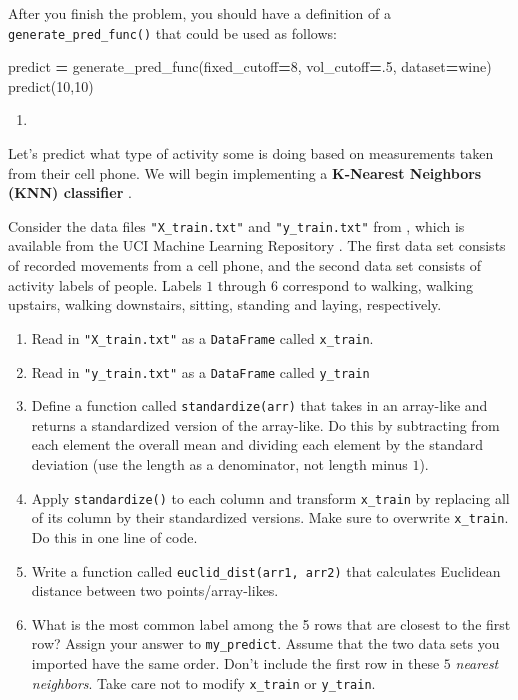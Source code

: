 \documentclass[
  12pt,
  krantz2]{krantz}
\makeatletter
\newenvironment{Shaded}{\begin{snugshade}}{\end{snugshade}}
\newcommand{\DecValTok}[1]{\textcolor[rgb]{0.06,0.06,0.06}{#1}}
\newcommand{\FloatTok}[1]{\textcolor[rgb]{0.06,0.06,0.06}{#1}}
\newcommand{\NormalTok}[1]{#1}
\newcommand{\OperatorTok}[1]{\textcolor[rgb]{0.43,0.43,0.43}{\textbf{#1}}}
\providecommand{\tightlist}{%
  \setlength{\itemsep}{0pt}\setlength{\parskip}{0pt}}
\newenvironment{kframe}{%
\medskip{}
\setlength{\fboxsep}{.8em}
 \def\at@end@of@kframe{}%
 \ifinner\ifhmode%
  \def\at@end@of@kframe{\end{minipage}}%
  \begin{minipage}{\columnwidth}%
 \fi\fi%
 \def\FrameCommand##1{\hskip\@totalleftmargin \hskip-\fboxsep
 \colorbox{shadecolor}{##1}\hskip-\fboxsep
     \hskip-\linewidth \hskip-\@totalleftmargin \hskip\columnwidth}%
 \MakeFramed {\advance\hsize-\width
   \@totalleftmargin\z@ \linewidth\hsize
   \@setminipage}}%
 {\par\unskip\endMakeFramed%
 \at@end@of@kframe}
\renewenvironment{Shaded}{\begin{kframe}}{\end{kframe}}
\makeatother
\begin{document}
After you finish the problem, you should have a definition of a \texttt{generate\_pred\_func()} that could be used as follows:

\begin{Shaded}
\begin{Highlighting}[]
\NormalTok{predict }\OperatorTok{=}\NormalTok{ generate\_pred\_func(fixed\_cutoff}\OperatorTok{=}\DecValTok{8}\NormalTok{, vol\_cutoff}\OperatorTok{=}\FloatTok{.5}\NormalTok{, dataset}\OperatorTok{=}\NormalTok{wine)}
\NormalTok{predict(}\DecValTok{10}\NormalTok{,}\DecValTok{10}\NormalTok{)}
\end{Highlighting}
\end{Shaded}

\begin{enumerate}
\def\labelenumi{\arabic{enumi}.}
\setcounter{enumi}{2}
\tightlist
\item
\end{enumerate}

Let's predict what type of activity some is doing based on measurements taken from their cell phone. We will begin implementing a \textbf{K-Nearest Neighbors (KNN) classifier} \citep{knn1} \citep{knn2}.

Consider the data files \texttt{"X\_train.txt"} and \texttt{"y\_train.txt"} from \citep{Anguita2013APD}, which is available from the UCI Machine Learning Repository \citep{uci_data}. The first data set consists of recorded movements from a cell phone, and the second data set consists of activity labels of people. Labels \(1\) through \(6\) correspond to walking, walking upstairs, walking downstairs, sitting, standing and laying, respectively.

\begin{enumerate}
\def\labelenumi{\alph{enumi})}
\tightlist
\item
  Read in \texttt{"X\_train.txt"} as a \texttt{DataFrame} called \texttt{x\_train}.
\item
  Read in \texttt{"y\_train.txt"} as a \texttt{DataFrame} called \texttt{y\_train}
\item
  Define a function called \texttt{standardize(arr)} that takes in an array-like and returns a standardized version of the array-like. Do this by subtracting from each element the overall mean and dividing each element by the standard deviation (use the length as a denominator, not length minus \(1\)).
\item
  Apply \texttt{standardize()} to each column and transform \texttt{x\_train} by replacing all of its column by their standardized versions. Make sure to overwrite \texttt{x\_train}. Do this in one line of code.
\item
  Write a function called \texttt{euclid\_dist(arr1,\ arr2)} that calculates Euclidean distance between two points/array-likes.
\item
  What is the most common label among the 5 rows that are closest to the first row? Assign your answer to \texttt{my\_predict}. Assume that the two data sets you imported have the same order. Don't include the first row in these \(5\) \emph{nearest neighbors}. Take care not to modify \texttt{x\_train} or \texttt{y\_train}.
\end{enumerate}
\end{document}

